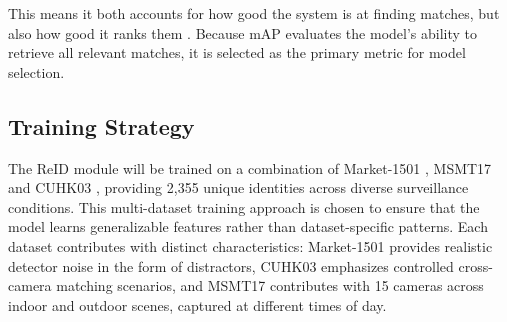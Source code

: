 \noindent This means it both accounts for how good the system is at finding matches, but also how good it ranks them \cite{mAPlightly}. Because \acs{mAP} evaluates the model’s ability to retrieve all relevant matches, it is selected as the primary metric for model selection.

\subsection{Training Strategy}\label{trainingstragegyreid}
The \acs{ReID} module will be trained on a combination of Market-1501 \cite{CVATM1501}, \acs{MSMT17} \cite{wei2018person} and \acs{CUHK03} \cite{KaggleCUHK03}, providing 2,355 unique identities across diverse surveillance conditions. This multi-dataset training approach is chosen to ensure that the model learns generalizable features rather than dataset-specific patterns. Each dataset contributes with distinct characteristics: Market-1501 provides realistic detector noise in the form of distractors, \acs{CUHK03} emphasizes controlled cross-camera matching scenarios, and \acs{MSMT17} contributes with 15 cameras across indoor and outdoor scenes, captured at different times of day.

